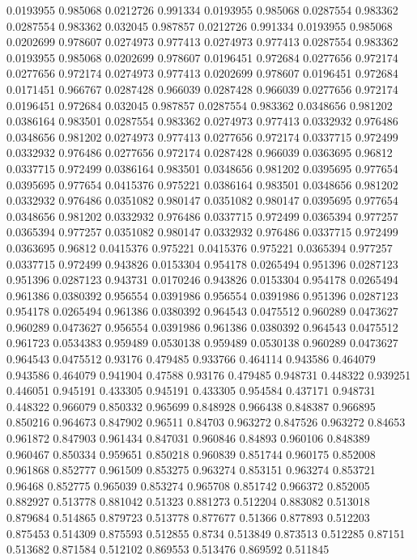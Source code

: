 0.0193955 0.985068
0.0212726 0.991334
0.0193955 0.985068
0.0287554 0.983362
0.0287554 0.983362
0.032045 0.987857
0.0212726 0.991334
0.0193955 0.985068
0.0202699 0.978607
0.0274973 0.977413
0.0274973 0.977413
0.0287554 0.983362
0.0193955 0.985068
0.0202699 0.978607
0.0196451 0.972684
0.0277656 0.972174
0.0277656 0.972174
0.0274973 0.977413
0.0202699 0.978607
0.0196451 0.972684
0.0171451 0.966767
0.0287428 0.966039
0.0287428 0.966039
0.0277656 0.972174
0.0196451 0.972684
0.032045 0.987857
0.0287554 0.983362
0.0348656 0.981202
0.0386164 0.983501
0.0287554 0.983362
0.0274973 0.977413
0.0332932 0.976486
0.0348656 0.981202
0.0274973 0.977413
0.0277656 0.972174
0.0337715 0.972499
0.0332932 0.976486
0.0277656 0.972174
0.0287428 0.966039
0.0363695 0.96812
0.0337715 0.972499
0.0386164 0.983501
0.0348656 0.981202
0.0395695 0.977654
0.0395695 0.977654
0.0415376 0.975221
0.0386164 0.983501
0.0348656 0.981202
0.0332932 0.976486
0.0351082 0.980147
0.0351082 0.980147
0.0395695 0.977654
0.0348656 0.981202
0.0332932 0.976486
0.0337715 0.972499
0.0365394 0.977257
0.0365394 0.977257
0.0351082 0.980147
0.0332932 0.976486
0.0337715 0.972499
0.0363695 0.96812
0.0415376 0.975221
0.0415376 0.975221
0.0365394 0.977257
0.0337715 0.972499
0.943826 0.0153304
0.954178 0.0265494
0.951396 0.0287123
0.951396 0.0287123
0.943731 0.0170246
0.943826 0.0153304
0.954178 0.0265494
0.961386 0.0380392
0.956554 0.0391986
0.956554 0.0391986
0.951396 0.0287123
0.954178 0.0265494
0.961386 0.0380392
0.964543 0.0475512
0.960289 0.0473627
0.960289 0.0473627
0.956554 0.0391986
0.961386 0.0380392
0.964543 0.0475512
0.961723 0.0534383
0.959489 0.0530138
0.959489 0.0530138
0.960289 0.0473627
0.964543 0.0475512
0.93176 0.479485
0.933766 0.464114
0.943586 0.464079
0.943586 0.464079
0.941904 0.47588
0.93176 0.479485
0.948731 0.448322
0.939251 0.446051
0.945191 0.433305
0.945191 0.433305
0.954584 0.437171
0.948731 0.448322
0.966079 0.850332
0.965699 0.848928
0.966438 0.848387
0.966895 0.850216
0.964673 0.847902
0.96511 0.84703
0.963272 0.847526
0.963272 0.84653
0.961872 0.847903
0.961434 0.847031
0.960846 0.84893
0.960106 0.848389
0.960467 0.850334
0.959651 0.850218
0.960839 0.851744
0.960175 0.852008
0.961868 0.852777
0.961509 0.853275
0.963274 0.853151
0.963274 0.853721
0.96468 0.852775
0.965039 0.853274
0.965708 0.851742
0.966372 0.852005
0.882927 0.513778
0.881042 0.51323
0.881273 0.512204
0.883082 0.513018
0.879684 0.514865
0.879723 0.513778
0.877677 0.51366
0.877893 0.512203
0.875453 0.514309
0.875593 0.512855
0.8734 0.513849
0.873513 0.512285
0.87151 0.513682
0.871584 0.512102
0.869553 0.513476
0.869592 0.511845
